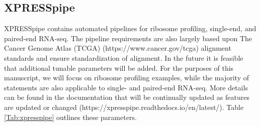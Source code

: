 \documentclass[11pt, a4paper, oneside]{article}
\begin{document}
\subsection{XPRESSpipe}
XPRESSpipe contains automated pipelines for ribosome profiling, single-end, and paired-end RNA-seq. The pipeline requirements are also largely based upon The Cancer Genome Atlas (TCGA) (https://www.cancer.gov/tcga) alignment standards and ensure standardization of alignment. In the future it is feasible that additional tunable parameters will be added. For the purposes of this manuscript, we will focus on ribosome profiling examples, while the majority of statements are also applicable to single- and paired-end RNA-seq. More details can be found in the documentation that will be continually updated as features are updated or changed (https://xpresspipe.readthedocs.io/en/latest/). Table \ref{Tab:xpresspipe} outlines these parameters.
\end{document}
